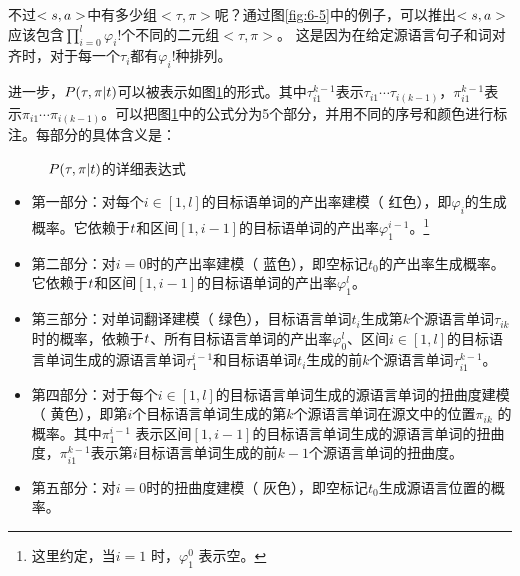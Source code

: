 \parinterval 不过$<{s},{a}>$中有多少组$<\tau,\pi>$呢？通过图\ref{fig:6-5}中的例子，可以推出$<{s},{a}>$应该包含$\prod_{i=0}^{l}{\varphi_i !}$个不同的二元组$<\tau,\pi>$。 这是因为在给定源语言句子和词对齐时，对于每一个$\tau_i$都有$\varphi_{i}!$种排列。


\parinterval 进一步，${P}(\tau,\pi|{t})$可以被表示如图\ref{fig:6-7}的形式。其中$\tau_{i1}^{k-1}$表示$\tau_{i1}\cdots \tau_{i(k-1)}$，$\pi_{i1}^{ k-1}$表示$\pi_{i1}\cdots \pi_{i(k-1)}$。可以把图\ref{fig:6-7}中的公式分为5个部分，并用不同的序号和颜色进行标注。每部分的具体含义是：

\begin{figure}[htp]
    \centering

   \caption{{${P}(\tau,\pi|t)$}的详细表达式}
\setlength{\belowcaptionskip}{-0.5em}
   \label{fig:6-7}
\end{figure}

\begin{itemize}
\item 第一部分：对每个$i\in[1,l]$的目标语单词的产出率建模（{\color{red!70} 红色}），即$\varphi_i$的生成概率。它依赖于${t}$和区间$[1,i-1]$的目标语单词的产出率$\varphi_1^{i-1}$。\footnote{这里约定，当$i=1$ 时，$\varphi_1^0$ 表示空。}
\vspace{0.5em}
\item 第二部分：对$i=0$时的产出率建模（{\color{blue!70} 蓝色}），即空标记$t_0$的产出率生成概率。它依赖于${t}$和区间$[1,i-1]$的目标语单词的产出率$\varphi_1^l$。
\vspace{0.5em}
\item 第三部分：对单词翻译建模（{\color{green!70} 绿色}），目标语言单词$t_i$生成第$k$个源语言单词$\tau_{ik}$时的概率，依赖于${t}$、所有目标语言单词的产出率$\varphi_0^l$、区间$i\in[1,l]$的目标语言单词生成的源语言单词$\tau_1^{i-1}$和目标语单词$t_i$生成的前$k$个源语言单词$\tau_{i1}^{k-1}$。
\vspace{0.5em}
\item 第四部分：对于每个$i\in[1,l]$的目标语言单词生成的源语言单词的扭曲度建模（{\color{yellow!70!black} 黄色}），即第$i$个目标语言单词生成的第$k$个源语言单词在源文中的位置$\pi_{ik}$ 的概率。其中$\pi_1^{i-1}$ 表示区间$[1,i-1]$的目标语言单词生成的源语言单词的扭曲度，$\pi_{i1}^{k-1}$表示第$i$目标语言单词生成的前$k-1$个源语言单词的扭曲度。
\vspace{0.5em}
\item 第五部分：对$i=0$时的扭曲度建模（{\color{gray!70} 灰色}），即空标记$t_0$生成源语言位置的概率。
\end{itemize}

